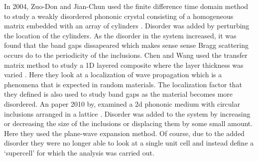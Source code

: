 \documentclass{article}
\begin{document}
In 2004, Zuo-Don and Jian-Chun used the finite difference time domain method to 
study a weakly disordered phononic crystal consisting of a homogeneous matrix 
embedded with an array of cylinders \cite{zuodon04}. Disorder was added by 
perturbing the 
location of the cylinders. As the disorder in the system increased, it was 
found that the band gaps dissapeared which makes sense sense Bragg scattering 
occurs do to the periodicity of the inclusions. Chen and Wang used the transfer 
matrix method to study a 1D layered composite where the layer thickness was 
varied \cite{chen07}. Here they look at a localization of wave propagation 
which is a phenomena that is expected in random materials. The localization 
factor that 
they defined is also used to study band gaps as the material becomes more 
disordered. An paper 2010 by, examined a 2d phononic medium with circular 
inclusions arranged in a lattice \cite{wang10}. Disorder was added to the 
system by 
increasing or decreasing the size of the inclusions or displacing them by some 
small amount. Here they used the plane-wave expansion method. Of course, due to 
the added disorder they were no longer able to look at a single unit cell and 
instead define a `supercell' for which the analysis was carried out. 


\end{document}
